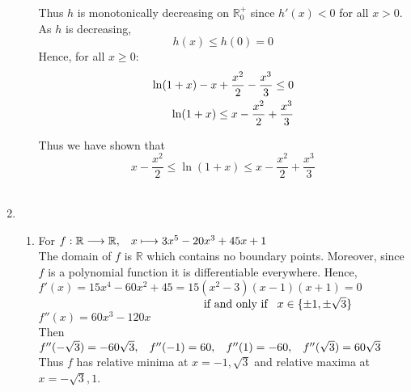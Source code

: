 \documentclass[12pt]{amsart}
\begin{document}
\begin{enumerate}
\begin{enumerate}
			Thus $h$ is monotonically decreasing on $\mathbb{R}_0^+$ since $h'(x)<0$ for all $x>0$.  As 
			$h$ is decreasing, %
			$$h(x) \le h(0) = 0$$
			Hence, for all $x\ge0:$
				\begin{align}
					\ln(1+x)-x+\frac{x^2}{2}-\frac{x^3}{3} \le 0 \notag \\
					\ln(1+x) \le x-\frac{x^2}{2}+\frac{x^3}{3} \notag
				\end{align}	
				
			Thus we have shown that 
			$$x-\frac{x^2}{2} \le \ln(1+x) \le x-\frac{x^2}{2}+\frac{x^3}{3}$$ \\
			 
		\end{enumerate}
								
	\item 
	
		\begin{enumerate}
		
			\item For $f: \mathbb{R} \longrightarrow \mathbb{R}, \hspace{0.3cm} x \longmapsto 							3x^5-20x^3+45x+1$ \\
			
				The domain of $f$ is $\mathbb{R}$ which contains no boundary points.  Moreover, since					$f$ is a polynomial function it is differentiable everywhere. Hence, \\
				
				$f'(x) = 15x^4-60x^2+45=15(x^2-3)(x-1)(x+1)=0$ \\
				$\text{ } \hspace{5cm} \text{if and only if} \hspace{0.3cm} x \in \{\pm1,\pm \sqrt{3}\}$ \\
				
				$f''(x) = 60x^3-120x$ \\ %
				
				Then $f''(-\sqrt{3})=-60\sqrt{3}, \hspace{0.3cm} f''(-1)=60, \hspace{0.3cm} f''(1)=-60, 
				\hspace{0.3cm} f''(\sqrt{3})=60\sqrt{3}$ \\
				
				Thus $f$ has relative minima at $x=-1,\sqrt{3}$ and relative maxima at $x=-\sqrt{3},1$. \\
				

\end{enumerate}
\end{enumerate}
\end{document}
